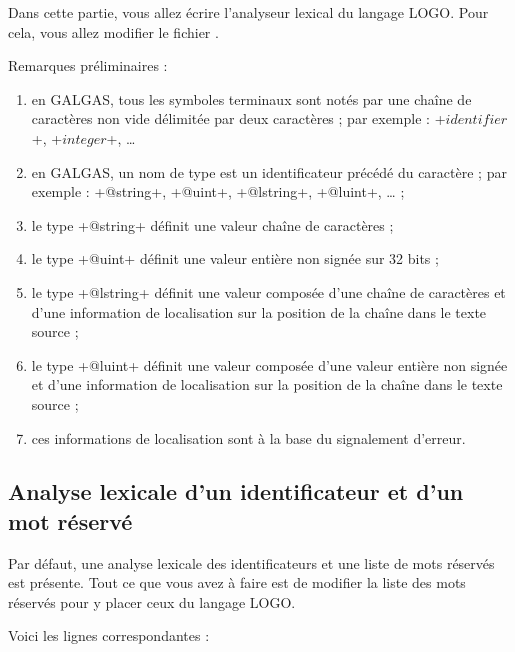 Dans cette partie, vous allez écrire l’analyseur lexical du langage LOGO. Pour cela, vous allez modifier le fichier .

Remarques préliminaires :
\begin{enumerate}
  \item en GALGAS, tous les symboles terminaux sont notés par une chaîne de caractères non vide délimitée par deux caractères \tpp{\$} ; par exemple : \ggs+$identifier$+, \ggs+$integer$+, … 
  \item en GALGAS, un nom de type est un identificateur précédé du caractère  ; par exemple : \ggs+@string+, \ggs+@uint+, \ggs+@lstring+, \ggs+@luint+, … ;
  \item le type \ggs+@string+ définit une valeur chaîne de caractères ;
  \item le type \ggs+@uint+ définit une valeur entière non signée sur 32 bits ;
  \item le type \ggs+@lstring+ définit une valeur composée d'une chaîne de caractères et d'une information de localisation sur la position de la chaîne dans le texte source ;
  \item le type \ggs+@luint+ définit une valeur composée d'une valeur entière non signée et d'une information de localisation sur la position de la chaîne dans le texte source ;
  \item ces informations de localisation sont à la base du signalement d'erreur.
\end{enumerate}

\subsection{Analyse lexicale d'un identificateur et d'un mot réservé}

Par défaut, une analyse lexicale des identificateurs et une liste de mots réservés est présente. Tout ce que vous avez à faire est de modifier la liste des mots réservés pour y placer ceux du langage LOGO.

Voici les lignes correspondantes :


